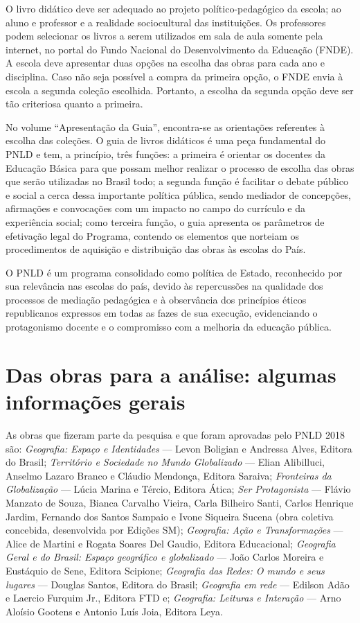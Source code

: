 \begin{refsection}
    O livro didático deve ser adequado ao projeto político-pedagógico da escola; ao aluno e professor e a realidade sociocultural das instituições. Os professores podem selecionar os livros a serem utilizados em sala de aula somente pela internet, no portal do Fundo Nacional do Desenvolvimento da Educação (FNDE). A escola deve apresentar duas opções na escolha das obras para cada ano e disciplina. Caso não seja possível a compra da primeira opção, o FNDE envia à escola a segunda coleção escolhida. Portanto, a escolha da segunda opção deve ser tão criteriosa quanto a primeira.  

    No volume “Apresentação da Guia”, encontra-se as orientações referentes à escolha das coleções. O guia de livros didáticos é uma peça fundamental do PNLD e tem, a princípio, três funções: a primeira é orientar os docentes da Educação Básica para que possam melhor realizar o processo de escolha das obras que serão utilizadas no Brasil todo; a segunda função é facilitar o debate público e social a cerca dessa importante política pública, sendo mediador de concepções, afirmações e convocações com um impacto no campo do currículo e da experiência social; como terceira função, o guia apresenta os parâmetros de efetivação legal do Programa, contendo os elementos que norteiam os procedimentos de aquisição e distribuição das obras às escolas do País.  

    O PNLD é um programa consolidado como política de Estado, reconhecido por sua relevância nas escolas do país, devido às repercussões na qualidade dos processos de mediação pedagógica e à observância dos princípios éticos republicanos expressos em todas as fazes de sua execução, evidenciando o protagonismo docente e o compromisso com a melhoria da educação pública. 


    \section{Das obras para a análise: algumas informações gerais}

    As obras que fizeram parte da pesquisa e que foram aprovadas pelo PNLD 2018 são: \textit{Geografia: Espaço e Identidades} --- Levon Boligian e Andressa Alves, Editora do Brasil; \textit{Território e Sociedade no Mundo Globalizado} --- Elian Alibilluci, Anselmo Lazaro Branco e Cláudio Mendonça, Editora Saraiva; \textit{Fronteiras da Globalização} --- Lúcia Marina e Tércio, Editora Ática; \textit{Ser Protagonista} --- Flávio Manzato de Souza, Bianca Carvalho Vieira, Carla Bilheiro Santi, Carlos Henrique Jardim, Fernando dos Santos Sampaio e Ivone Siqueira Sucena (obra coletiva concebida, desenvolvida por Edições SM); \textit{Geografia: Ação e Transformações} --- Alice de Martini e Rogata Soares Del Gaudio, Editora Educacional; \textit{Geografia Geral e do Brasil: Espaço geográfico e globalizado} --- João Carlos Moreira e Eustáquio de Sene, Editora Scipione; \textit{Geografia das Redes: O mundo e seus lugares} --- Douglas Santos, Editora do Brasil; \textit{Geografia em rede} --- Edilson Adão e Laercio Furquim Jr., Editora FTD e; \textit{Geografia: Leituras e Interação} --- Arno Aloísio Gootens e Antonio Luís Joia, Editora Leya.



\end{refsection}
